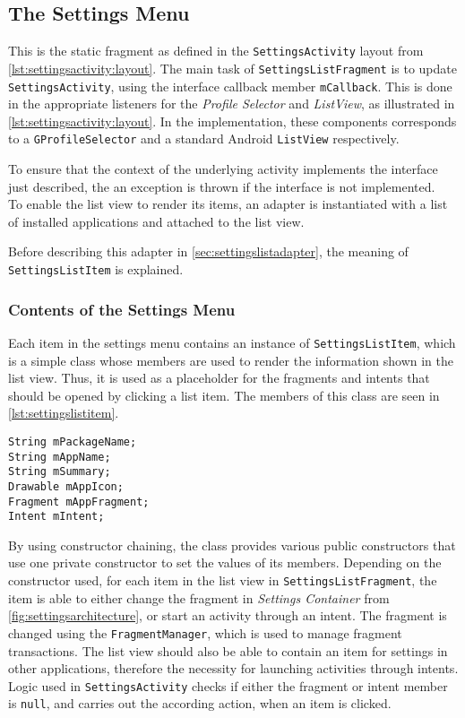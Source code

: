 \subsection{The Settings Menu}\label{sec:settingslistfragment}
This is the static fragment as defined in the \lstinline|SettingsActivity| layout from \cref{lst:settingsactivity:layout}.
The main task of \lstinline|SettingsListFragment| is to update \lstinline|SettingsActivity|, using the interface callback member \lstinline|mCallback|.
This is done in the appropriate listeners for the \textit{Profile Selector} and \textit{ListView}, as illustrated in \cref{lst:settingsactivity:layout}.
In the implementation, these components corresponds to a \lstinline|GProfileSelector| and a standard Android \lstinline|ListView| respectively.

To ensure that the context of the underlying activity implements the interface just described, the an exception is thrown if the interface is not implemented.\\

To enable the list view to render its items, an adapter is instantiated with a list of installed applications and attached to the list view.

Before describing this adapter in \cref{sec:settingslistadapter}, the meaning of \lstinline|SettingsListItem| is explained.

\subsubsection{Contents of the Settings Menu}
Each item in the settings menu contains an instance of \lstinline|SettingsListItem|, which is a simple class whose members are used to render the information shown in the list view.
Thus, it is used as a placeholder for the fragments and intents that should be opened by clicking a list item.
The members of this class are seen in \cref{lst:settingslistitem}.

\begin{lstlisting}[caption={Members of the \lstinline|SettingsListItem| class.}, label={lst:settingslistitem}]
String mPackageName;
String mAppName;
String mSummary;
Drawable mAppIcon;
Fragment mAppFragment;
Intent mIntent;
\end{lstlisting}

By using constructor chaining, the class provides various public constructors that use one private constructor to set the values of its members.
Depending on the constructor used, for each item in the list view in \lstinline|SettingsListFragment|, the item is able to either change the fragment in \textit{Settings Container} from \cref{fig:settingsarchitecture}, or start an activity through an intent.
The fragment is changed using the \lstinline|FragmentManager|, which is used to manage fragment transactions.
The list view should also be able to contain an item for settings in other \giraf applications, therefore the necessity for launching activities through intents.
Logic used in \lstinline|SettingsActivity| checks if either the fragment or intent member is \lstinline|null|, and carries out the according action, when an item is clicked.